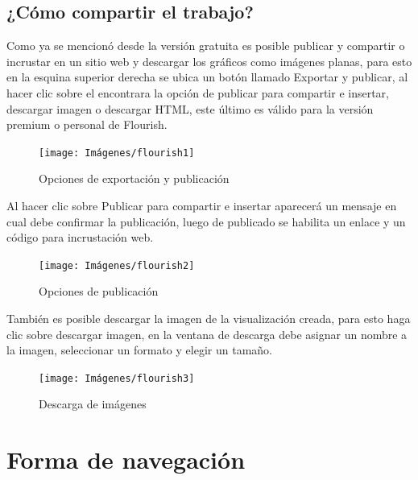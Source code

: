 \documentclass[
]{book}
\begin{document}
\hypertarget{cuxf3mo-compartir-el-trabajo}{%
\subsection{¿Cómo compartir el trabajo?}\label{cuxf3mo-compartir-el-trabajo}}

Como ya se mencionó desde la versión gratuita es posible publicar y compartir o incrustar en un sitio web y descargar los gráficos como imágenes planas, para esto en la esquina superior derecha se ubica un botón llamado Exportar y publicar, al hacer clic sobre el encontrara la opción de publicar para compartir e insertar, descargar imagen o descargar HTML, este último es válido para la versión premium o personal de Flourish.

\begin{figure}

{\centering \texttt{[image: Imágenes/flourish1]} 

}

\caption{Opciones de exportación y publicación}\label{fig:compartirtrabajoflourish-fig}
\end{figure}

Al hacer clic sobre Publicar para compartir e insertar aparecerá un mensaje en cual debe confirmar la publicación, luego de publicado se habilita un enlace y un código para incrustación web.

\begin{figure}

{\centering \texttt{[image: Imágenes/flourish2]} 

}

\caption{Opciones de publicación}\label{fig:compartirtrabajoflourishpublicar-fig}
\end{figure}

También es posible descargar la imagen de la visualización creada, para esto haga clic sobre descargar imagen, en la ventana de descarga debe asignar un nombre a la imagen, seleccionar un formato y elegir un tamaño.

\begin{figure}

{\centering \texttt{[image: Imágenes/flourish3]} 

}

\caption{Descarga de imágenes}\label{fig:compartirtrabajoflourishdescargarimagen-fig}
\end{figure}

\hypertarget{formanavegacionflourish}{%
\section{Forma de navegación}\label{formanavegacionflourish}}
\end{document}
